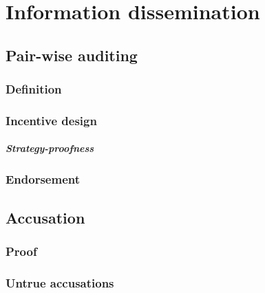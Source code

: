 \chapter{Information dissemination}

\section{Pair-wise auditing}

\subsection{Definition}
\subsection{Incentive design}
\paragraph{Strategy-proofness}
\subsection{Endorsement}

\section{Accusation}
\subsection{Proof}
\subsection{Untrue accusations}
